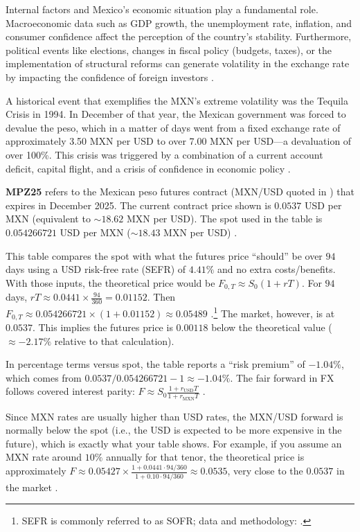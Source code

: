 \documentclass[10pt,a4paper]{article} %
\begin{document}
Internal factors and Mexico's economic situation play a fundamental role. Macroeconomic data such as GDP growth, the unemployment rate, inflation, and consumer confidence affect the perception of the country's stability. Furthermore, political events like elections, changes in fiscal policy (budgets, taxes), or the implementation of structural reforms can generate volatility in the exchange rate by impacting the confidence of foreign investors \citep{banxico_regional_2024}.

A historical event that exemplifies the MXN's extreme volatility was the Tequila Crisis in 1994. In December of that year, the Mexican government was forced to devalue the peso, which in a matter of days went from a fixed exchange rate of approximately 3.50 MXN per USD to over 7.00 MXN per USD—a devaluation of over 100\%. This crisis was triggered by a combination of a current account deficit, capital flight, and a crisis of confidence in economic policy \citep{imf_tequila_2012,yale_tequila_2012}.


\textbf{MPZ25} refers to the Mexican peso futures contract (MXN/USD quoted in ) that expires in December 2025. The current contract price shown is \(0.0537\) USD per MXN (equivalent to \(\sim 18.62\) MXN per USD). The spot used in the table is \(0.054266721\) USD per MXN (\(\sim 18.43\) MXN per USD) \citep{cme_mxn_product,cme_mxn_rulebook}.

This table compares the spot with what the futures price “should” be over \(94\) days using a USD risk-free rate (SEFR) of \(4.41\%\) and no extra costs/benefits. With those inputs, the theoretical price would be \(F_{0,T} \approx S_0(1+rT)\). For \(94\) days, \(rT \approx 0.0441 \times \frac{94}{360} = 0.01152\). Then \(F_{0,T} \approx 0.054266721 \times (1+0.01152) \approx \mathbf{0.05489}\) \citep{frbny_sofr}.\footnote{SEFR is commonly referred to as SOFR; data and methodology: \citep{frbny_sofr,frbny_sofr_index}.}
The market, however, is at \(0.0537\). This implies the futures price is \(0.00118\) below the theoretical value (\(\approx -2.17\%\) relative to that calculation).

In percentage terms versus spot, the table reports a “risk premium” of \(-1.04\%\), which comes from \(0.0537/0.054266721 - 1 \approx -1.04\%\).
The fair forward in FX follows covered interest parity: \(F \approx S_0 \frac{1 + r_{\text{USD}} T}{1 + r_{\text{MXN}} T}\) \citep{bis_cip_2016,bis_cip_2024}.

Since MXN rates are usually higher than USD rates, the MXN/USD forward is normally below the spot (i.e., the USD is expected to be more expensive in the future), which is exactly what your table shows. For example, if you assume an MXN rate around \(10\%\) annually for that tenor, the theoretical price is approximately \(F \approx 0.05427 \times \frac{1 + 0.0441 \cdot 94/360}{1 + 0.10 \cdot 94/360} \approx 0.0535\), very close to the \(0.0537\) in the market \citep{bis_cip_2016}.
\end{document}
